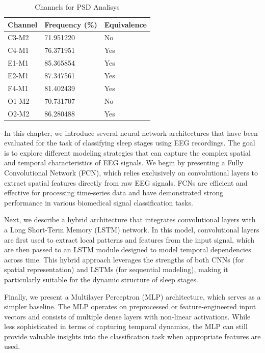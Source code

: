 \begin{table}[H]
\begin{center}
\begin{tabular}{ |p{3cm}||p{3cm}||p{3cm}| }
 \hline
 Channel & Frequency (\%) & Equivalence\\
 \hline  
 C3-M2 & 71.951220 & No \\
 C4-M1 & 76.371951 & Yes \\
 E1-M1 & 85.365854 & Yes \\
 E2-M1 & 87.347561 & Yes \\
 F4-M1 & 81.402439 & Yes \\
 O1-M2 & 70.731707 & No \\
 O2-M2 & 86.280488 & Yes \\
 \hline
\end{tabular}
\end{center}
\caption{Channels for PSD Analisys}
\label{tab3}
\end{table}

In this chapter, we introduce several neural network architectures that have been evaluated for the task of classifying sleep stages using EEG recordings. The goal is to explore different modeling strategies that can capture the complex spatial and temporal characteristics of EEG signals. We begin by presenting a Fully Convolutional Network (FCN), which relies exclusively on convolutional layers to extract spatial features directly from raw EEG signals. FCNs are efficient and effective for processing time-series data and have demonstrated strong performance in various biomedical signal classification tasks.

Next, we describe a hybrid architecture that integrates convolutional layers with a Long Short-Term Memory (LSTM) network. In this model, convolutional layers are first used to extract local patterns and features from the input signal, which are then passed to an LSTM module designed to model temporal dependencies across time. This hybrid approach leverages the strengths of both CNNs (for spatial representation) and LSTMs (for sequential modeling), making it particularly suitable for the dynamic structure of sleep stages.

Finally, we present a Multilayer Perceptron (MLP) architecture, which serves as a simpler baseline. The MLP operates on preprocessed or feature-engineered input vectors and consists of multiple dense layers with non-linear activations. While less sophisticated in terms of capturing temporal dynamics, the MLP can still provide valuable insights into the classification task when appropriate features are used.

